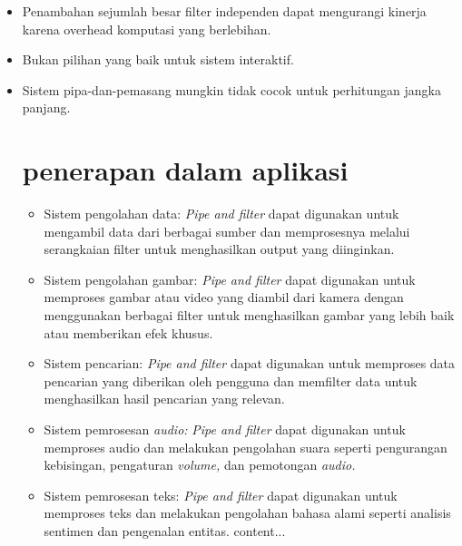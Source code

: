 	\begin{itemize}
		\item 	Penambahan sejumlah besar filter independen dapat mengurangi kinerja karena overhead komputasi yang berlebihan.
		\item Bukan pilihan yang baik untuk sistem interaktif.
		\item Sistem pipa-dan-pemasang mungkin tidak cocok untuk perhitungan jangka panjang.
		
	\section{penerapan dalam aplikasi}
		\begin{itemize}
			\item Sistem pengolahan data: \textit{Pipe and filter} dapat digunakan untuk mengambil data dari berbagai sumber dan memprosesnya melalui serangkaian filter untuk menghasilkan output yang diinginkan.
			
			\item Sistem pengolahan gambar: \textit{Pipe and filter} dapat digunakan untuk memproses gambar atau video yang diambil dari kamera dengan menggunakan berbagai filter untuk menghasilkan gambar yang lebih baik atau memberikan efek khusus.
			
			\item Sistem pencarian: \textit{Pipe and filter} dapat digunakan untuk memproses data pencarian yang diberikan oleh pengguna dan memfilter data untuk menghasilkan hasil pencarian yang relevan.
			
			\item Sistem pemrosesan \textit{audio:} \textit{Pipe and filter} dapat digunakan untuk memproses audio dan melakukan pengolahan suara seperti pengurangan kebisingan, pengaturan \textit{volume,} dan pemotongan \textit{audio.}
			
			\item Sistem pemrosesan teks: \textit{Pipe and filter} dapat digunakan untuk memproses teks dan melakukan pengolahan bahasa alami seperti analisis sentimen dan pengenalan entitas.
			content...
		\end{itemize}
	\end{itemize}

